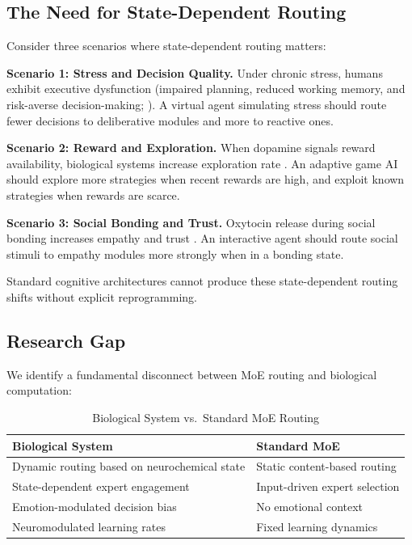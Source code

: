 \documentclass[preprint,12pt]{elsarticle}
\begin{document}
\subsection{The Need for State-Dependent Routing}

Consider three scenarios where state-dependent routing matters:

\textbf{Scenario 1: Stress and Decision Quality.}
Under chronic stress, humans exhibit executive dysfunction (impaired planning, reduced working memory, and risk-averse decision-making; \cite{arnsten2009}). A virtual agent simulating stress should route fewer decisions to deliberative modules and more to reactive ones.

\textbf{Scenario 2: Reward and Exploration.}
When dopamine signals reward availability, biological systems increase exploration rate \cite{cools2011}. An adaptive game AI should explore more strategies when recent rewards are high, and exploit known strategies when rewards are scarce.

\textbf{Scenario 3: Social Bonding and Trust.}
Oxytocin release during social bonding increases empathy and trust \cite{dunbar2009}. An interactive agent should route social stimuli to empathy modules more strongly when in a bonding state.

Standard cognitive architectures cannot produce these state-dependent routing shifts without explicit reprogramming.

\subsection{Research Gap}

We identify a fundamental disconnect between MoE routing and biological computation:

\begin{table}[htbp]
\centering
\caption{Biological System vs.\ Standard MoE Routing}
\label{tab:gap}
\begin{tabular}{ll}
\toprule
\textbf{Biological System} & \textbf{Standard MoE} \\
\midrule
Dynamic routing based on neurochemical state & Static content-based routing \\
State-dependent expert engagement & Input-driven expert selection \\
Emotion-modulated decision bias & No emotional context \\
Neuromodulated learning rates & Fixed learning dynamics \\
\bottomrule
\end{tabular}
\end{table}
\end{document}
